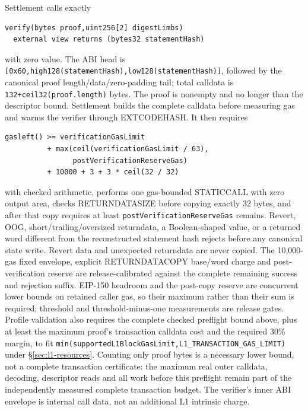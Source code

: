 \documentclass[a4paper,11pt]{article}
\newcommand{\code}[1]{\nolinkurl{#1}}
\begin{document}
Settlement calls exactly
\begin{verbatim}
verify(bytes proof,uint256[2] digestLimbs)
  external view returns (bytes32 statementHash)
\end{verbatim}
with zero value.  The ABI head is
\code{[0x60,high128(statementHash),low128(statementHash)]}, followed by the
canonical proof length/data/zero-padding tail; total calldata is
\code{132+ceil32(proof.length)} bytes.  The proof is nonempty and no longer
than the descriptor bound.  Settlement builds the complete calldata before
measuring gas and warms the verifier through EXTCODEHASH.  It then requires
\begin{verbatim}
gasleft() >= verificationGasLimit
          + max(ceil(verificationGasLimit / 63),
                postVerificationReserveGas)
          + 10000 + 3 + 3 * ceil(32 / 32)
\end{verbatim}
with checked arithmetic, performs one gas-bounded STATICCALL with zero output
area, checks RETURNDATASIZE before copying exactly 32 bytes, and after that copy
requires at least \code{postVerificationReserveGas} remains.  Revert, OOG,
short/trailing/oversized returndata, a Boolean-shaped value, or a returned word
different from the reconstructed statement hash rejects before any canonical
state write.  Revert data and unexpected returndata are never copied.  The
10,000-gas fixed envelope, explicit RETURNDATACOPY base/word charge and
post-verification reserve are release-calibrated against the complete remaining
success and rejection suffix.  EIP-150 headroom and the post-copy reserve are
concurrent lower bounds on retained caller gas, so their maximum rather than
their sum is required; threshold and
threshold-minus-one measurements are release gates.  Profile validation also
requires the complete checked preflight bound above, plus at least the
maximum proof's transaction calldata cost and the required 30\% margin, to fit
\code{min(supportedL1BlockGasLimit,L1_TRANSACTION_GAS_LIMIT)} under
\S\ref{sec:l1-resources}.  Counting only proof bytes is a necessary lower
bound, not a complete transaction certificate: the maximum real outer calldata,
decoding, descriptor reads and all work before this preflight remain part of
the independently measured complete transaction budget.  The verifier's inner
ABI envelope is internal call data, not an additional L1 intrinsic charge.
\end{document}
